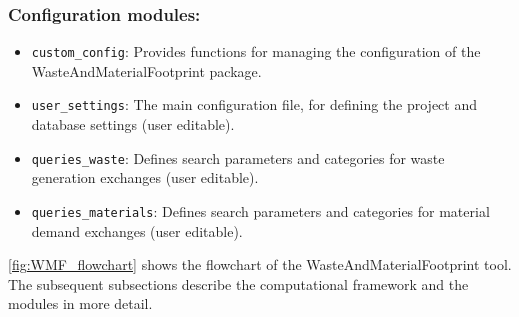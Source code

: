 \subsubsection{Configuration modules:}
\begin{itemize}
    \item \texttt{custom\_config}: Provides functions for managing the configuration of the WasteAndMaterialFootprint package.
    \item \texttt{user\_settings}: The main configuration file, for defining the project and database settings (user editable).
    \item \texttt{queries\_waste}: Defines search parameters and categories for waste generation exchanges (user editable).
    \item \texttt{queries\_materials}: Defines search parameters and categories for material demand exchanges (user editable).
\end{itemize}

\autoref{fig:WMF_flowchart} shows the flowchart of the WasteAndMaterialFootprint tool. The subsequent subsections describe the computational framework and the modules in more detail.

